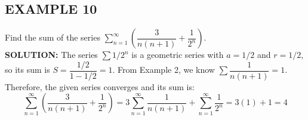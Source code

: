 \documentclass{article}
\begin{document}
\subsection*{EXAMPLE 10}
Find the sum of the series \( \sum_{n=1}^{\infty} \left( \dfrac{3}{n(n+1)} + \dfrac{1}{2^n} \right) \).\\
\textbf{SOLUTION:}
The series \( \sum 1/2^n \) is a geometric series with \(a=1/2\) and \(r=1/2\), so its sum is \( S = \dfrac{1/2}{1-1/2} = 1 \).
From Example 2, we know \( \sum \dfrac{1}{n(n+1)} = 1 \).
Therefore, the given series converges and its sum is:
\[ \sum_{n=1}^{\infty} \left( \dfrac{3}{n(n+1)} + \dfrac{1}{2^n} \right) = 3 \sum_{n=1}^{\infty} \dfrac{1}{n(n+1)} + \sum_{n=1}^{\infty} \dfrac{1}{2^n} = 3(1) + 1 = 4 \]
\end{document}
